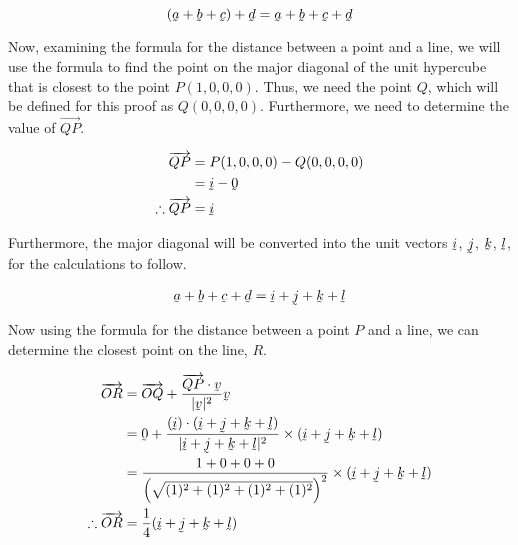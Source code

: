 \documentclass[a4paper]{article}
\begin{document}
\begin{enumerate}[label=\textbf{\arabic*.}]
\begin{enumerate}
		$$
		(\underaccent{\tilde}{a} + \underaccent{\tilde}{b} + \underaccent{\tilde}{c}) + \underaccent{\tilde}{d} = \underaccent{\tilde}{a} + \underaccent{\tilde}{b} + \underaccent{\tilde}{c} + \underaccent{\tilde}{d}
		$$

		Now, examining the formula for the distance between a point and a line, we will use the formula to find the point on the major diagonal of the unit hypercube that is closest to the point $P(1,0,0,0)$. Thus, we need the point $Q$, which will be defined for this proof as $Q(0,0,0,0)$. Furthermore, we need to determine the value of $\overrightarrow{QP}$.

		\begin{align*}
		\overrightarrow{QP} & = P(1,0,0,0) - Q(0,0,0,0)\\
		& = \underaccent{\tilde}{i} - \underaccent{\tilde}{0}\\
		\therefore \overrightarrow{QP} & = \underaccent{\tilde}{i}\\
		\end{align*}

		Furthermore, the major diagonal will be converted into the unit vectors $\underaccent{\tilde}{i}$, $\underaccent{\tilde}{j}$, $\underaccent{\tilde}{k}$, $\underaccent{\tilde}{l}$, for the calculations to follow.

		\begin{align*}
		\underaccent{\tilde}{a} + \underaccent{\tilde}{b} + \underaccent{\tilde}{c} + \underaccent{\tilde}{d} & = \underaccent{\tilde}{i} + \underaccent{\tilde}{j} + \underaccent{\tilde}{k} + \underaccent{\tilde}{l}\\
		\end{align*}

		Now using the formula for the distance between a point $P$ and a line, we can determine the closest point on the line, $R$.

		\begin{align*}
		\overrightarrow{OR} & = \overrightarrow{OQ} + \frac{\overrightarrow{QP}\cdot{\underaccent{\tilde}{v}}}{|\underaccent{\tilde}{v}|^2}\underaccent{\tilde}{v}\\
		& = \underaccent{\tilde}{0} + \frac{(\underaccent{\tilde}{i})\cdot(\underaccent{\tilde}{i} + \underaccent{\tilde}{j} + \underaccent{\tilde}{k} + \underaccent{\tilde}{l})}{|\underaccent{\tilde}{i} + \underaccent{\tilde}{j} + \underaccent{\tilde}{k} + \underaccent{\tilde}{l}|^2}\times(\underaccent{\tilde}{i} + \underaccent{\tilde}{j} + \underaccent{\tilde}{k} + \underaccent{\tilde}{l})\\
		& = \frac{1+0+0+0}{\left(\sqrt{(1)^2 + (1)^2 + (1)^2 + (1)^2}\right)^2}\times(\underaccent{\tilde}{i} + \underaccent{\tilde}{j} + \underaccent{\tilde}{k} + \underaccent{\tilde}{l})\\
		\therefore \overrightarrow{OR} & = \frac{1}{4}(\underaccent{\tilde}{i} + \underaccent{\tilde}{j} + \underaccent{\tilde}{k} + \underaccent{\tilde}{l})\\
		\end{align*}


\end{enumerate}
\end{enumerate}
\end{document}
